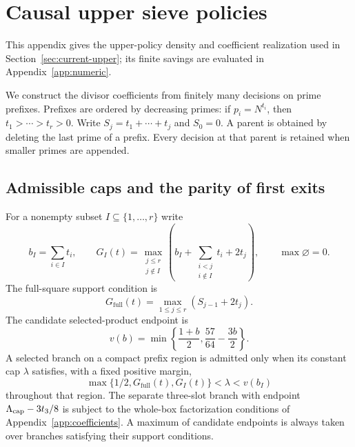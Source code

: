 \section{Causal upper sieve policies}\label{app:upper}

This appendix gives the upper-policy density and coefficient realization used in Section~\ref{sec:current-upper}; its finite savings are evaluated in Appendix~\ref{app:numeric}.

We construct the divisor coefficients from finitely many decisions
on prime prefixes. Prefixes are ordered by decreasing primes:
if $p_i=N^{t_i}$, then $t_1>\cdots>t_r>0$.
Write $S_j=t_1+\cdots+t_j$ and $S_0=0$.
A parent is obtained by deleting the last prime of a prefix.
Every decision at that parent is retained when smaller primes
are appended.

\subsection{Admissible caps and the parity of first exits}

For a nonempty subset $I\subseteq\{1,\ldots,r\}$ write
\begin{equation}\label{sv:selected-gate}
 b_I=\sum_{i\in I}t_i,\qquad
 G_I(t)=\max_{\substack{j\le r\\j\notin I}}
 \left(b_I+\sum_{\substack{i<j\\i\notin I}}t_i+2t_j\right),
 \qquad \max\varnothing=0.
\end{equation}
The full-square support condition is
\begin{equation}\label{sv:full-gate}
 G_{\mathrm{full}}(t)=\max_{1\le j\le r}(S_{j-1}+2t_j).
\end{equation}
The candidate selected-product endpoint is
\begin{equation}\label{sv:tent}
 v(b)=\min\left\{\frac{1+b}{2},\frac{57}{64}-\frac{3b}{2}\right\}.
\end{equation}
A selected branch on a compact prefix region is admitted only when
its constant cap $\lambda$ satisfies, with a fixed positive margin,
\begin{equation}\label{sv:branch-licence}
 \max\{1/2,G_{\mathrm{full}}(t),G_I(t)\}
       <\lambda<v(b_I)
\end{equation}
throughout that region.  The separate three-slot branch with endpoint
$\Lambda_{\rm cap}-3t_3/8$ is subject to the whole-box factorization conditions
of Appendix~\ref{app:coefficients}.  A maximum of candidate endpoints
is always taken over branches satisfying their support conditions.

